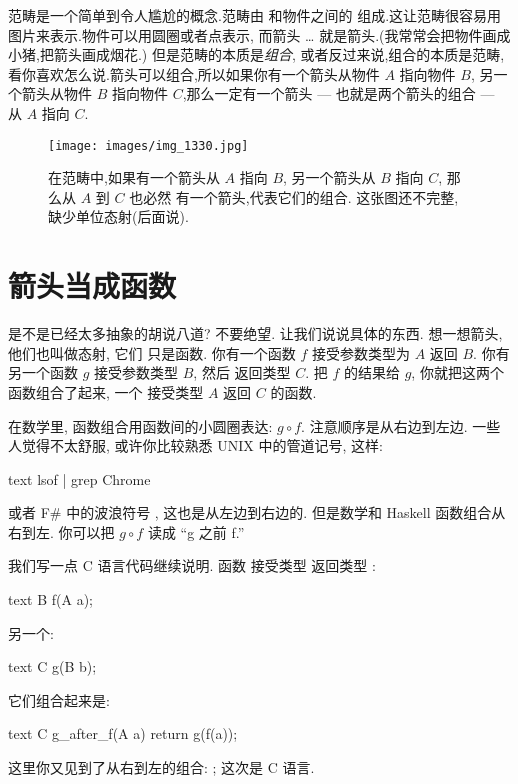 
\lettrine[lhang=0.17]{范畴} 是一个简单到令人尴尬的概念.范畴由 
和物件之间的  组成.这让范畴很容易用图片来表示.物件可以用圆圈或者点表示,
而箭头 \ldots{} 就是箭头.(我常常会把物件画成小猪,把箭头画成烟花.) 但是范畴的本质是\emph{组合},
或者反过来说,组合的本质是范畴,看你喜欢怎么说.箭头可以组合,所以如果你有一个箭头从物件 $A$ 指向物件 $B$,
另一个箭头从物件 $B$ 指向物件 $C$,那么一定有一个箭头 --- 也就是两个箭头的组合 --- 从 $A$ 指向 $C$.

\begin{figure}
  \centering
  \texttt{[image: images/img\_1330.jpg]}
  \caption{在范畴中,如果有一个箭头从 $A$ 指向 $B$, 另一个箭头从 $B$ 指向 $C$, 那么从 $A$ 到 $C$ 也必然
  有一个箭头,代表它们的组合. 这张图还不完整,缺少单位态射(后面说).}
\end{figure}

\section{箭头当成函数}

是不是已经太多抽象的胡说八道? 不要绝望. 让我们说说具体的东西. 想一想箭头, 他们也叫做态射, 它们
只是函数. 你有一个函数 $f$ 接受参数类型为 $A$ 返回 $B$. 你有另一个函数 $g$ 接受参数类型 $B$, 然后
返回类型 $C$. 把 $f$ 的结果给 $g$, 你就把这两个函数组合了起来, 一个 接受类型 $A$ 返回 $C$ 的函数.

在数学里, 函数组合用函数间的小圆圈表达: $g \circ f$. 注意顺序是从右边到左边. 一些人觉得不太舒服,
或许你比较熟悉 UNIX 中的管道记号, 这样:

\begin{snip}{text}
lsof | grep Chrome
\end{snip}
或者 F\# 中的波浪符号 \code{>>}, 这也是从左边到右边的. 但是数学和 Haskell 函数组合从右到左.
你可以把 $g \circ f$ 读成 ``g 之前 f.''

我们写一点 C 语言代码继续说明. 函数  接受类型  返回类型 :

\begin{snip}{text}
B f(A a);
\end{snip}
另一个:

\begin{snip}{text}
C g(B b);
\end{snip}
它们组合起来是:

\begin{snip}{text}
C g_after_f(A a)
{
    return g(f(a));
}
\end{snip}
这里你又见到了从右到左的组合: ; 这次是 C 语言.

